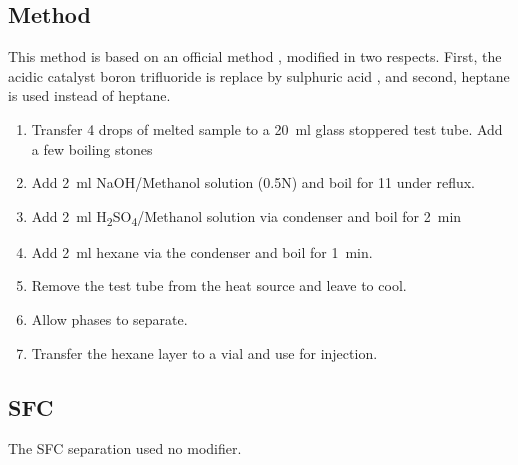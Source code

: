 \subsection{Method}

This method is based on an official method \autocite{AOCS2017}, modified in two
respects. First, the acidic catalyst boron trifluoride is replace by sulphuric
acid , and second, heptane is used instead of heptane.

\begin{enumerate}
\item Transfer \num{4} drops of melted sample to a \SI{20}{\milli\litre} glass stoppered test tube. Add a few boiling stones 
\item Add \SI{2}{\milli\litre} NaOH/Methanol solution (0.5N) and boil for \SI{11}{\min} under reflux. 
\item Add \SI{2}{\milli\litre} H\textsubscript{2}SO\textsubscript{4}/Methanol solution via condenser and
boil for \SI{2}{\minute} 
\item  Add \SI{2}{\milli\litre} hexane via the condenser and boil for \SI{1}{\minute}.
\item Remove the test tube from the heat source and leave to cool. 
\item Allow phases to separate.
\item Transfer the hexane layer to a vial and use for injection.
\end{enumerate}

\subsection{SFC}

The SFC separation used no modifier. 

\todos